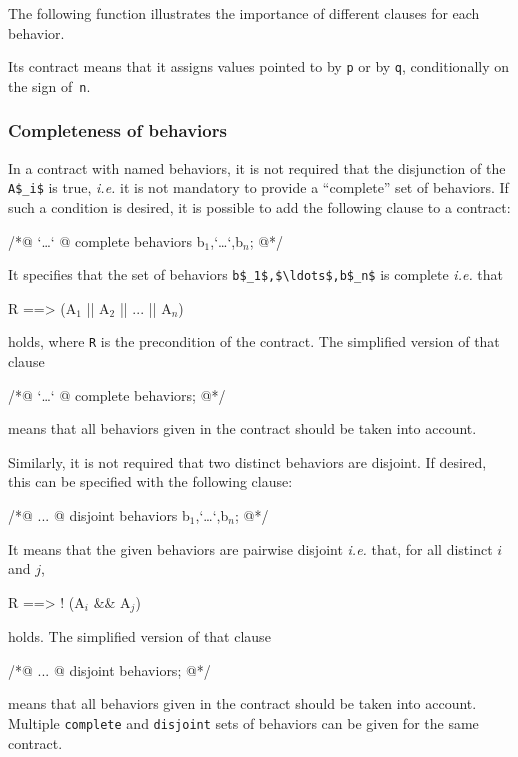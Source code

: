 \begin{example}
  The following function illustrates the importance of different
  \assigns{} clauses for each behavior.

%
  Its contract means that it assigns values pointed to by
  \lstinline|p| or by \lstinline|q|,
  conditionally on the sign of~\lstinline|n|.
\end{example}


\subsubsection{Completeness of behaviors}
\label{sec:compl-behav}
In a contract with named behaviors, it is not required that
the disjunction of the \lstinline|A$_i$| is true, \emph{i.e.} it is not 
mandatory to provide a ``complete'' set of behaviors.
If such a condition is desired, it is possible to add the following clause
to a contract:
\begin{listing-nonumber}
/*@ `\dots`
  @ complete behaviors b$_1$,`\dots`,b$_n$;
  @*/
\end{listing-nonumber}
It specifies that the set of behaviors \lstinline|b$_1$,$\ldots$,b$_n$| 
is complete \emph{i.e.} that
\begin{listing-nonumber}
R ==> (A$_1$ || A$_2$ || ... || A$_n$)
\end{listing-nonumber}
holds, where \lstinline|R| is the precondition of the contract.
The simplified version of that clause
\begin{listing-nonumber}
/*@ `\dots`
  @ complete behaviors;
  @*/
\end{listing-nonumber}
means that all behaviors given in the contract should be taken into account.

Similarly, it is not required that two distinct behaviors are disjoint.
If desired, this can be specified with the following clause:
\begin{listing-nonumber}
/*@ ...
  @ disjoint behaviors b$_1$,`\dots`,b$_n$;
  @*/
\end{listing-nonumber}
It means that the given behaviors are pairwise disjoint \emph{i.e.}
that, for all distinct $i$ and $j$,
\begin{listing-nonumber}
R ==> ! (A$_i$ && A$_j$)
\end{listing-nonumber}
holds.
The simplified version of that clause
\begin{listing-nonumber}
/*@ ...
  @ disjoint behaviors;
  @*/
\end{listing-nonumber}
means that all behaviors given in the contract should be taken into account.
Multiple \lstinline|complete| and \lstinline|disjoint| sets of behaviors can
be given for the same contract.

